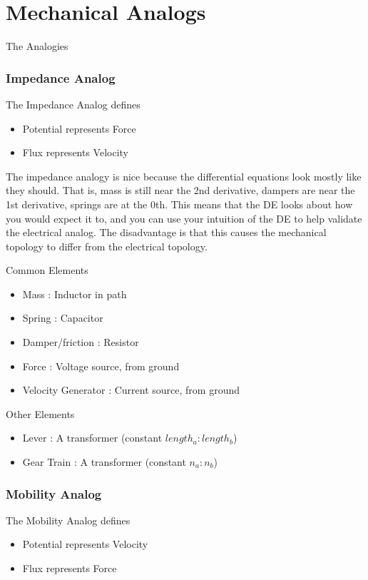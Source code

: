 \documentclass{../templates/topic}
\begin{document}
\chapter{Mechanical Analogs}

\begin{section}{The Analogies}
	\subsection{Impedance Analog}
		The Impedance Analog defines
		\begin{itemize}
			\item Potential represents Force
			\item Flux represents Velocity
		\end{itemize}
		The impedance analogy is nice because the differential equations look mostly like they should. That is, mass is still near the 2nd derivative, dampers are near the 1st derivative, springs are at the 0th. This means that the DE looks about how you would expect it to, and you can use your intuition of the DE to help validate the electrical analog. The disadvantage is that this causes the mechanical topology to differ from the electrical topology.
		
		Common Elements
		\begin{itemize}
			\item Mass : Inductor in path
			\item Spring : Capacitor
			\item Damper/friction : Resistor
			\item Force : Voltage source, from ground
			\item Velocity Generator : Current source, from ground
		\end{itemize}
		
		Other Elements
		\begin{itemize}
			\item Lever : A transformer (constant $length_a : length_b$)
			\item Gear Train : A transformer (constant $n_a : n_b$)
		\end{itemize}

	\subsection{Mobility Analog}
		The Mobility Analog defines
		\begin{itemize}
			\item Potential represents Velocity
			\item Flux represents Force
		\end{itemize}
		

\end{section}
\end{document}
